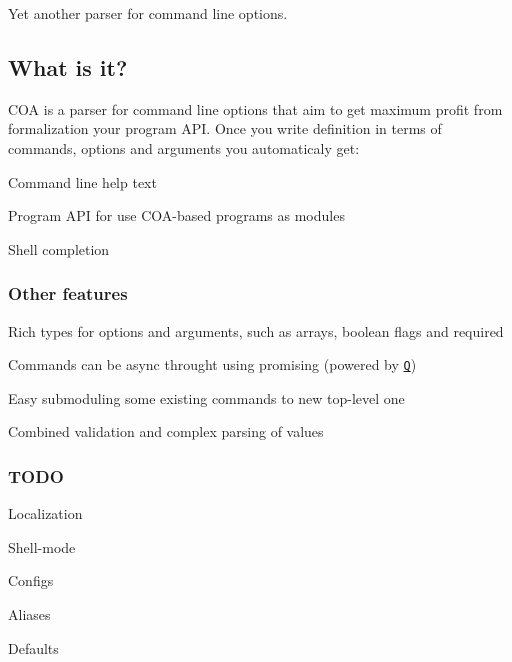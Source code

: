 Yet another parser for command line options.

\href{https://www.npmjs.org/package/coa}{\tt } \href{https://travis-ci.org/veged/coa}{\tt } \href{https://ci.appveyor.com/project/zxqfox/coa}{\tt } \href{https://coveralls.io/r/veged/coa}{\tt } \href{https://david-dm.org/veged/coa}{\tt }

\subsection*{What is it?}

C\+OA is a parser for command line options that aim to get maximum profit from formalization your program A\+PI. Once you write definition in terms of commands, options and arguments you automaticaly get\+:


\begin{DoxyItemize}
\item Command line help text
\item Program A\+PI for use C\+O\+A-\/based programs as modules
\item Shell completion
\end{DoxyItemize}

\subsubsection*{Other features}


\begin{DoxyItemize}
\item Rich types for options and arguments, such as arrays, boolean flags and required
\item Commands can be async throught using promising (powered by \href{https://github.com/kriskowal/q}{\tt Q})
\item Easy submoduling some existing commands to new top-\/level one
\item Combined validation and complex parsing of values
\end{DoxyItemize}

\subsubsection*{T\+O\+DO}


\begin{DoxyItemize}
\item Localization
\item Shell-\/mode
\item Configs
\begin{DoxyItemize}
\item Aliases
\item Defaults
\end{DoxyItemize}
\end{DoxyItemize}

